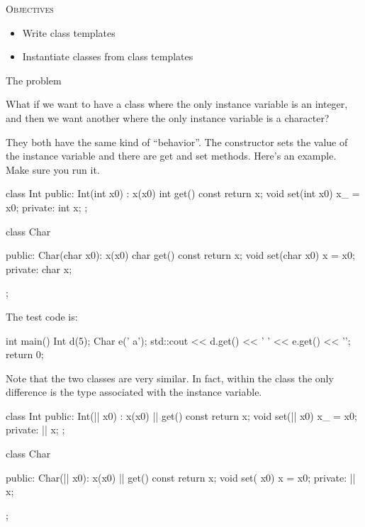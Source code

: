 \newpage{}

\textsc{Objectives}

\begin{itemize}
\item
  Write class templates
\item
  Instantiate classes from class templates
\end{itemize}

The problem

What if we want to have a class where the only instance variable is an integer, and then we want another where the only instance variable is a character?

They both have the same kind of ``behavior''. The constructor sets the
value of the instance variable and there are get and set methods. Here's
an example. Make sure you run it.

\begin{console}
class Int
{
public:
     Int(int x0)
         : x(x0)
     {}
     int get() const { return x; }
     void set(int x0) { x_ = x0; }
private:
     int x;
};

class Char
{
public:
     Char(char x0): x(x0) {}
     char get() const { return x; }
     void set(char x0) { x = x0; }
private:
     char x;

}; 
\end{console}

The test code is:

\begin{console}
int main()
{   
    Int d(5);
    Char e(' a');
    std::cout << d.get() << ' '
              << e.get() << '\n';
    return 0;
} 
\end{console}

Note that the two classes are very similar. In fact, within the class
the only difference is the type associated with the instance variable.

\begin{consolethree}[escapeinside=||]
class Int
{
public:
     Int(|| x0)
           : x(x0)
     {}
     || get() const { return x; }
     void set(|| x0) { x_ = x0; }
private:
     || x;
};

class Char
{
public:
     Char(|| x0): x(x0) {}
     || get() const { return x; }
     void set( x0) { x = x0; }
private:
     || x;

}; 
\end{consolethree}

